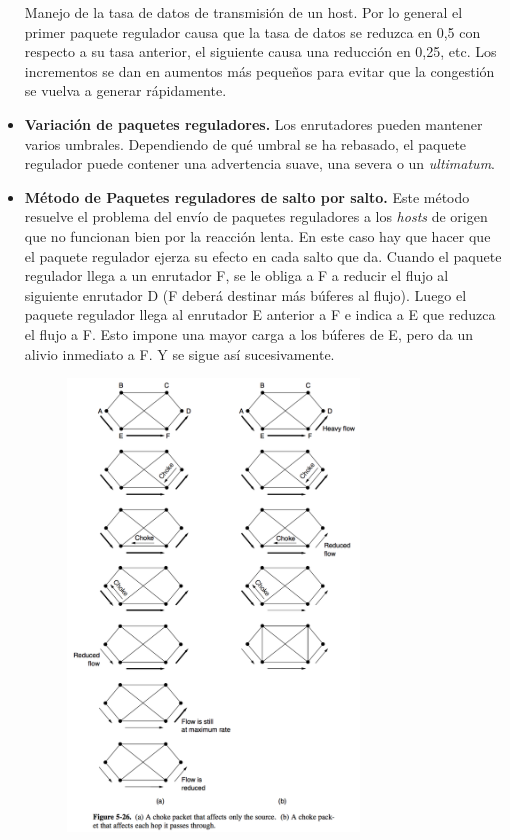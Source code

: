 \begin{itemize}
			\par Manejo de la tasa de datos de transmisión de un host. Por lo general el primer paquete regulador causa que la tasa de datos se reduzca en 0,5 con respecto a su tasa anterior, el siguiente causa una reducción en 0,25, etc. Los incrementos se dan en aumentos más pequeños para evitar que la congestión se vuelva a generar rápidamente.

			\item \textbf{Variación de paquetes reguladores.} Los enrutadores pueden mantener varios umbrales. Dependiendo de qué umbral se ha rebasado, el paquete regulador puede contener una advertencia suave, una severa o un \textit{ultimatum}.
			
			\item \textbf{Método de Paquetes reguladores de salto por salto.} Este método resuelve el problema del envío de paquetes reguladores a los \textit{hosts} de origen que no funcionan bien por la reacción lenta. En este caso hay que hacer que el paquete regulador ejerza su efecto en cada salto que da. Cuando el paquete regulador llega a un enrutador F, se le obliga a F a reducir el flujo al siguiente enrutador D (F deberá destinar más búferes al flujo). Luego el paquete regulador llega al enrutador E anterior a F e indica a E que reduzca el flujo a F. Esto impone una mayor carga a los búferes de E, pero da un alivio inmediato a F. Y se sigue así sucesivamente.
			
			\begin{center}
				\includegraphics[width=10cm, height=12cm]{./imagenes/salto.png} 
			\end{center}
	
		\end{itemize}

